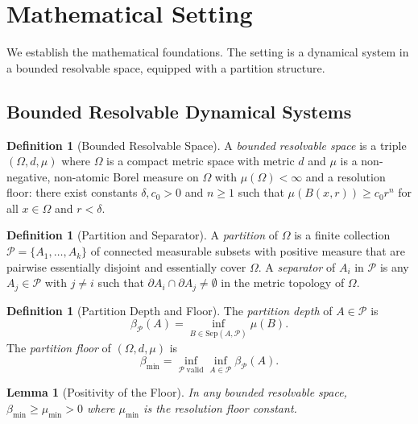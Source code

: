 \documentclass[11pt,twocolumn,a4paper]{article}
\theoremstyle{plain}
\newtheorem{lemma}[theorem]{Lemma}
\theoremstyle{definition}
\newtheorem{definition}[theorem]{Definition}
\theoremstyle{remark}
\newcommand{\bmin}{\beta_{\min}}
\newcommand{\mumin}{\mu_{\min}}
\newcommand{\Pcal}{\mathcal{P}}
\begin{document}
\section{Mathematical Setting}
\label{sec:setting}

We establish the mathematical foundations. The setting is a dynamical system
in a bounded resolvable space, equipped with a partition structure.

\subsection{Bounded Resolvable Dynamical Systems}

\begin{definition}[Bounded Resolvable Space]
\label{def:brs}
A \emph{bounded resolvable space} is a triple $(\Omega, d, \mu)$ where
$\Omega$ is a compact metric space with metric $d$ and $\mu$ is a non-negative,
non-atomic Borel measure on $\Omega$ with $\mu(\Omega) < \infty$ and a
resolution floor: there exist constants $\delta, c_0 > 0$ and $n \geq 1$ such
that $\mu(B(x,r)) \geq c_0 r^n$ for all $x \in \Omega$ and $r < \delta$.
\end{definition}

\begin{definition}[Partition and Separator]
\label{def:partition}
A \emph{partition} of $\Omega$ is a finite collection $\Pcal = \{A_1, \ldots,
A_k\}$ of connected measurable subsets with positive measure that are pairwise
essentially disjoint and essentially cover $\Omega$. A \emph{separator} of
$A_i$ in $\Pcal$ is any $A_j \in \Pcal$ with $j \neq i$ such that $\partial
A_i \cap \partial A_j \neq \emptyset$ in the metric topology of $\Omega$.
\end{definition}

\begin{definition}[Partition Depth and Floor]
\label{def:partdepth}
The \emph{partition depth} of $A \in \Pcal$ is
\[
  \beta_\Pcal(A) = \inf_{B \in \mathrm{Sep}(A,\Pcal)} \mu(B).
\]
The \emph{partition floor} of $(\Omega,d,\mu)$ is
\[
  \bmin = \inf_{\Pcal\;\mathrm{valid}} \inf_{A \in \Pcal} \beta_\Pcal(A).
\]
\end{definition}

\begin{lemma}[Positivity of the Floor]
\label{lem:posfloor}
In any bounded resolvable space, $\bmin \geq \mumin > 0$ where $\mumin$ is the
resolution floor constant.
\end{lemma}
\end{document}

